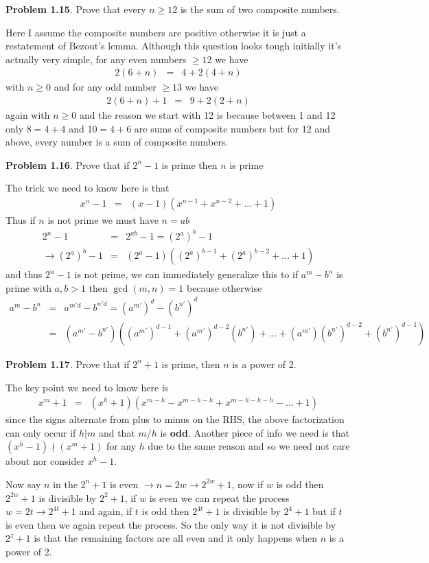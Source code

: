 \documentclass[aps,preprint,preprintnumbers,nofootinbib,showpacs,prd]{revtex4-1}
\newcommand{\nbea}{\begin{eqnarray*}}
\newcommand{\neea}{\end{eqnarray*}}
\begin{document}
{\bf Problem 1.15}. Prove that every $n \ge 12$ is the sum of two composite numbers.

Here I assume the composite numbers are positive otherwise it is just a restatement of Bezout's lemma. Although this question looks tough initially it's actually very simple, for any even numbers $\ge 12$ we have
%
\nbea
2(6 + n) & = & 4 + 2(4+n)
\neea
%
with $n \ge 0$ and for any odd number $\ge 13$ we have
%
\nbea
2(6 + n) + 1 & = & 9 + 2(2 + n)
\neea
%
again with $n \ge 0$ and the reason we start with 12 is because between 1 and 12 only $8=4+4$ and $10=4+6$ are sums of composite numbers but for 12 and above, every number is a sum of composite numbers.

{\bf Problem 1.16}. Prove that if $2^n - 1$ is prime then $n$ is prime

The trick we need to know here is that
%
\nbea
x^n - 1 & = & (x - 1)(x^{n-1} + x^{n-2} + \dots + 1)
\neea
%
Thus if $n$ is not prime we must have $n = ab$
%
\nbea
2^n - 1 & = & 2^{ab} - 1 = (2^a)^b - 1 \\
\to (2^a)^b - 1 & = & (2^a - 1)((2^a)^{b-1} + (2^a)^{b-2} + \dots + 1)
\neea
%
and thus $2^n - 1$ is not prime, we can immediately generalize this to if $a^m - b^n$ is prime with $a,b > 1$ then $\gcd(m,n) = 1$ because otherwise
%
\nbea
a^m - b^n & = & a^{m'd} - b^{n'd} = (a^{m'})^d - (b^{n'})^d \\
& = & \left (a^{m'} - b^{n'} \right ) \left ((a^{m'})^{d-1} + (a^{m'})^{d-2} (b^{n'})+ \dots + (a^{m'})(b^{n'})^{d-2} + (b^{n'})^{d-1} \right )
\neea
%

{\bf Problem 1.17}. Prove that if $2^n + 1$ is prime, then $n$ is a power of 2.

The key point we need to know here is
%
\nbea
x^m + 1 & = & (x^h + 1)(x^{m-h} - x^{m-h-h} + x^{m-h-h-h} - \ldots + 1)
\neea
%
since the signs alternate from plus to minus on the RHS, the above factorization can only occur if $h|m$ and that $m/h$ is {\bf odd}. Another piece of info we need is that $(x^h-1)\nmid(x^m+1)$ for any $h$ due to the same reason and so we need not care about nor consider $x^h-1$.

Now say $n$ in the $2^n+1$ is even $\to n=2w \to 2^{2w} + 1$, now if $w$ is odd then $2^{2w} + 1$ is divisible by $2^2 + 1$, if $w$ is even we can repeat the process $w = 2t \to 2^{4t} + 1$ and again, if $t$ is odd then $2^{4t} + 1$ is divisible by $2^4 + 1$ but if $t$ is even then we again repeat the process. So the only way it is not divisible by $2^z+1$ is that the remaining factors are all even and it only happens when $n$ is a power of 2.
\end{document}
